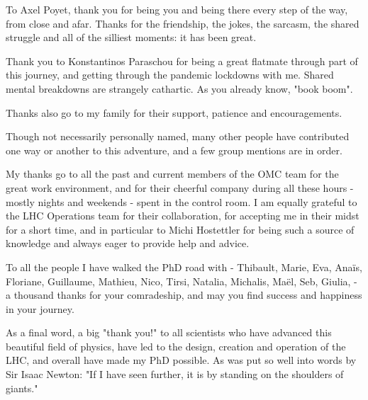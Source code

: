 \begin{acknowledgements}
To Axel Poyet, thank you for being you and being there every step of the way, from close and afar.
Thanks for the friendship, the jokes, the sarcasm, the shared struggle and all of the silliest moments: it has been great.

Thank you to Konstantinos Paraschou for being a great flatmate through part of this journey, and getting through the pandemic lockdowns with me.
Shared mental breakdowns are strangely cathartic.
As you already know, "book boom".

Thanks also go to my family for their support, patience and encouragements.
\newline

Though not necessarily personally named, many other people have contributed one way or another to this adventure, and a few group mentions are in order.
\newline

My thanks go to all the past and current members of the OMC team for the great work environment, and for their cheerful company during all these hours - mostly nights and weekends - spent in the control room.
I am equally grateful to the LHC Operations team for their collaboration, for accepting me in their midst for a short time, and in particular to Michi Hostettler for being such a source of knowledge and always eager to provide help and advice.

To all the people I have walked the PhD road with - Thibault, Marie, Eva, Anaïs, Floriane, Guillaume, Mathieu, Nico, Tirsi, Natalia, Michalis, Maël, Seb, Giulia, - a thousand thanks for your comradeship, and may you find success and happiness in your journey.

As a final word, a big "thank you!" to all scientists who have advanced this beautiful field of physics, have led to the design, creation and operation of the LHC, and overall have made my PhD possible.
As was put so well into words by Sir Isaac Newton: "If I have seen further, it is by standing on the shoulders of giants."

\end{acknowledgements}